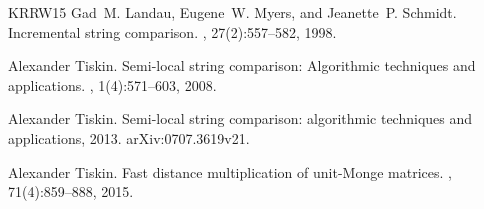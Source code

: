 \documentclass[10pt]{article}
\begin{document}
\begin{thebibliography}{KRRW15}
Gad~M. Landau, Eugene~W. Myers, and Jeanette~P. Schmidt.
\newblock Incremental string comparison.
, 27(2):557--582, 1998.

Alexander Tiskin.
\newblock Semi-local string comparison: Algorithmic techniques and
  applications.
, 1(4):571--603, 2008.

Alexander Tiskin.
\newblock Semi-local string comparison: algorithmic techniques and
  applications, 2013.
\newblock arXiv:0707.3619v21.

Alexander Tiskin.
\newblock Fast distance multiplication of unit-{M}onge matrices.
, 71(4):859--888, 2015.

\end{thebibliography}
\end{document}
